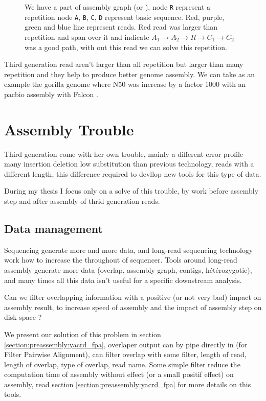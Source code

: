 \documentclass[./main.tex]{subfiles}
\begin{document}
\begin{figure}[ht]
    \centering
    
    \caption{We have a part of assembly graph (\OLC or \DBG), node \texttt{R} represent a repetition node \texttt{A}, \texttt{B}, \texttt{C}, \texttt{D} represent basic sequence. Red, purple, green and blue line represent reads. Red read was larger than repetition and span over it and indicate $A_1 \rightarrow A_2 \rightarrow R \rightarrow C_1 \rightarrow C_2$ was a good path, with out this read we can solve this repetition.}
    \label{intro:fig:whylongreads}
\end{figure}

Third generation read aren't larger than all repetition but larger than many repetition and they help to produce better genome assembly. We can take as an example the gorilla genome where N50 was increase by a factor 1000 with an pacbio assembly with Falcon \cite{gorilla_genome}.

\section{Assembly Trouble}

Third generation come with her own trouble, mainly a different error profile many insertion deletion low substitution than previous technology, reads with a different length, this difference required to devllop new tools for this type of data.

During my thesis I focus only on a solve of this trouble, by work before assembly step and after assembly of thrid generation reads.

\subsection{Data management}

Sequencing generate more and more data, and long-read sequencing technology work how to increase the throughout of sequencer. Tools around long-read assembly generate more data (overlap, assembly graph, contigs, hétérozygotie), and many times all this data isn't useful for a specific downstream analysis.

Can we filter overlapping information with a positive (or not very bad) impact on assembly result, to increase speed of assembly and the impact of assembly step on disk space ?

We present our solution of this problem \fpa in section \ref{section:preassembly:yacrd_fpa}, overlaper output can by pipe directly in \fpa (for Filter Pairwise Alignment), \fpa can filter overlap with some filter, length of read, length of overlap, type of overlap, read name. Some simple \fpa filter reduce the computation time of assembly without effect (or a small positif effect) on assembly, read section \ref{section:preassembly:yacrd_fpa} for more details on this tools.
\end{document}

